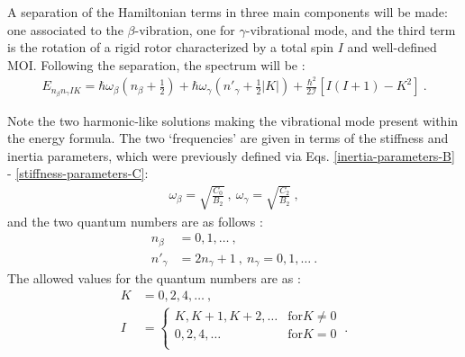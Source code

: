 A separation of the Hamiltonian terms in three main components will be made: one associated to the $\beta$-vibration, one for $\gamma$-vibrational mode, and the third term is the rotation of a rigid rotor characterized by a total spin $I$ and well-defined MOI. Following the separation, the spectrum will be \cite{ring2004nuclear,li2022model}:
\begin{align}
    E_{n_\beta n_\gamma IK}=\hbar\omega_\beta\left(n_\beta+\frac{1}{2}\right)+\hbar\omega_\gamma\left(n'_\gamma+\frac{1}{2}|K|\right)+\frac{\hbar^2}{2\mathcal{I}}\left[I(I+1)-K^2\right]\ .
    \label{collective-rotation-vibration-energy-spectrum}
\end{align}

Note the two harmonic-like solutions making the vibrational mode present within the energy formula. The two `frequencies' are given in terms of the stiffness and inertia parameters, which were previously defined via Eqs. \ref{inertia-parameters-B} - \ref{stiffness-parameters-C}:
\begin{align}
\omega_\beta=\sqrt{\frac{C_0}{B_2}}\ ,\ \omega_\gamma=\sqrt{\frac{C_2}{B_2}}\ ,   
\end{align}
and the two quantum numbers are as follows \cite{li2022model}: 
\begin{align}
    n_\beta&=0,1,\dots\ ,\\
    n'_\gamma&=2n_\gamma+1\ ,\ n_\gamma=0,1,\dots\ .
\end{align}
The allowed values for the quantum numbers are as \cite{li2022model}:
\begin{align}
    K&=0,2,4,\dots\ ,\nonumber\\
    I&=\begin{cases}
        K,K+1,K+2,\dots &\text{for} K\neq 0\\
        0,2,4,\dots &\text{for} K=0\\
   \end{cases}\ .
\end{align}

